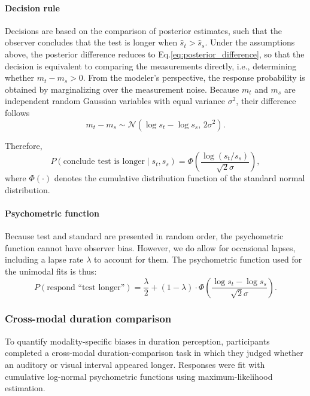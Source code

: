\documentclass{biorxiv}
\begin{document}
\paragraph{Decision rule}

Decisions are based on the comparison of posterior estimates, such that the observer concludes that the test is longer when $\hat{s}_t > \hat{s}_s$. Under the assumptions above, the posterior difference reduces to Eq.\ref{eq:posterior_difference}, so that the decision is equivalent to comparing the measurements directly, i.e., determining whether $m_t - m_s> 0$. From the modeler's perspective, the response probability is obtained by marginalizing over the measurement noise. Because $m_t$ and $m_s$ are independent random Gaussian variables with equal variance $\sigma^2$, their difference follows
\begin{equation}
m_t - m_s
\sim
\mathcal{N}\!\left(
\log s_t - \log s_s,
\, 2\sigma^2
\right).
\end{equation}

Therefore,
\begin{equation}
P(\text{conclude test is longer} \mid s_t, s_s)
=
\Phi\!\left(
\frac{\log(s_t/s_s)}{\sqrt{2}\sigma}
\right),
\end{equation}
where $\Phi(\cdot)$ denotes the cumulative distribution function of the standard normal distribution.

\paragraph{Psychometric function}
Because test and standard are presented in random order, the psychometric function cannot have observer bias. However, we do allow for occasional lapses, including a lapse rate $\lambda$ to account for them. The psychometric function used for the unimodal fits is thus:
\begin{equation}
P(\text{respond ``test longer''}) = \frac{\lambda}{2} + (1-\lambda) \cdot \Phi\left( \frac{\log s_t - \log s_s}{\sqrt{2}\sigma} \right).
\end{equation}

\subsubsection{Cross-modal duration comparison}

To quantify modality-specific biases in duration perception, participants completed a cross-modal duration-comparison task in which they judged whether an auditory or visual interval appeared longer. Responses were fit with cumulative log-normal psychometric functions using maximum-likelihood estimation.
\end{document}
